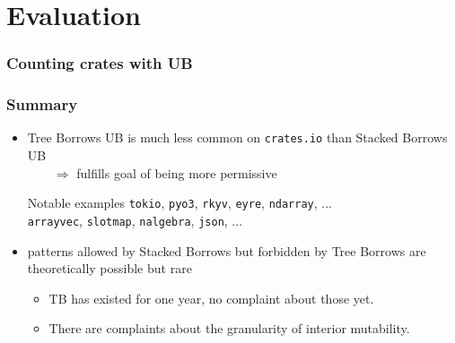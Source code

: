 \section{Evaluation}

\begin{frame}
    \frametitle{Counting crates with UB}
    \begin{figure}
    \end{figure}
\end{frame}

\begin{frame}
    \frametitle{Summary}
    \begin{itemize}
        \item Tree Borrows UB is much less common on \texttt{crates.io} than Stacked Borrows UB\\
            \(\qquad\Rightarrow\) fulfills goal of being more permissive
            \begin{block}{Notable examples}
                \texttt{tokio}, \texttt{pyo3}, \texttt{rkyv}, \texttt{eyre}, \texttt{ndarray}, ...\\
                \texttt{arrayvec}, \texttt{slotmap}, \texttt{nalgebra}, \texttt{json}, ...\\
            \end{block}
        \item patterns allowed by Stacked Borrows but forbidden by Tree Borrows are theoretically
            possible but rare
            \begin{itemize}
                \item TB has existed for one year, no complaint about those yet.
                \item There are complaints about the granularity of interior mutability.
            \end{itemize}
    \end{itemize}
\end{frame}


